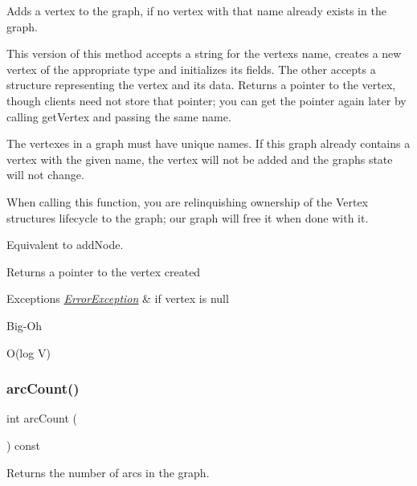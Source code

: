 Adds a vertex to the graph, if no vertex with that name already exists in the graph. 

This version of this method accepts a string for the vertex\textquotesingle{}s name, creates a new vertex of the appropriate type and initializes its fields. The other accepts a structure representing the vertex and its data. Returns a pointer to the vertex, though clients need not store that pointer; you can get the pointer again later by calling get\+Vertex and passing the same name.

The vertexes in a graph must have unique names. If this graph already contains a vertex with the given name, the vertex will not be added and the graph\textquotesingle{}s state will not change.

When calling this function, you are relinquishing ownership of the Vertex structure\textquotesingle{}s lifecycle to the graph; our graph will free it when done with it.

Equivalent to add\+Node.

\begin{DoxyReturn}{Returns}
a pointer to the vertex created 
\end{DoxyReturn}

\begin{DoxyExceptions}{Exceptions}
{\em \mbox{\hyperlink{classErrorException}{Error\+Exception}}} & if vertex is null \\
\hline
\end{DoxyExceptions}
\begin{DoxyRefDesc}{Big-\/\+Oh}
\item[\mbox{\hyperlink{BigOh__BigOh000007}{Big-\/\+Oh}}]O(log V) \end{DoxyRefDesc}
\mbox{\label{classGraph_ac0b108b3354f5222d2c829dcd639fa7a}} 
\subsubsection{\texorpdfstring{arc\+Count()}{arcCount()}}
{\footnotesize\ttfamily int arc\+Count (\begin{DoxyParamCaption}{ }\end{DoxyParamCaption}) const\hspace{0.3cm}{\ttfamily [inherited]}}



Returns the number of arcs in the graph. 

